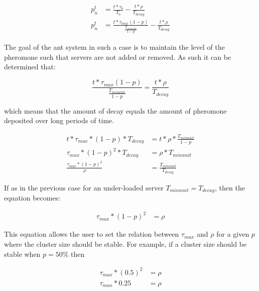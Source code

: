 \begin{equation}
\begin{aligned}
p^{t}_{n} &= \frac{t *  \tau_{b}}{T_{b}} - \frac{t *  \rho}{T_{decay}} \\
p^{t}_{n} &= \frac{t *  \tau_{max}(1 - p)}{\frac{T_{minwait}}{1 - p}} - \frac{t *  \rho}{T_{decay}}
\end{aligned}
\end{equation}

The goal of the ant system in such a case is to maintain the level of the pheromone such that servers are not added or removed. As such it can be determined that:

\begin{equation}
\frac{t *  \tau_{max}(1 - p)}{\frac{T_{minwait}}{1 - p}} = \frac{t *  \rho}{T_{decay}}
\end{equation}

which means that the amount of decay equals the amount of pheromone deposited over long periods of time.

\begin{equation}
\begin{aligned}
t *  \tau_{max} * (1 - p) * T_{decay} &= t *  \rho * \frac{T_{minwait}}{1 - p} \\
\tau_{max} * (1 - p)^2 * T_{decay} &= \rho * T_{minwait} \\
\frac{\tau_{max} * (1 - p)^2}{\rho} &= \frac{T_{minwait}}{T_{decay}}
\end{aligned}
\end{equation}

If as in the previous case for an under-loaded server $T_{minwait} = T_{decay}$, then the equation becomes:

\begin{equation}
\begin{aligned}
\tau_{max} * (1 - p)^2 &= \rho
\end{aligned}
\end{equation}

This equation allows the user to set the relation between $\tau_{max}$ and $\rho$ for a given $p$ where the cluster size should be stable. For example, if a cluster size should be stable when $p = 50\%$ then

\begin{equation}
\begin{aligned}
\tau_{max} * (0.5)^2 &= \rho \\
\tau_{max} * 0.25 &= \rho
\end{aligned}
\end{equation}

